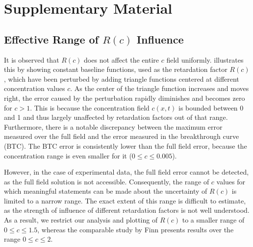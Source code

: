 \appendix
\chapter{Supplementary Material}
\section*{Effective Range of $R(c)$ Influence}
\label{app:supplementary}
It is observed that $R(c)$ does not affect the entire $c$ field uniformly.  illustrates this by showing constant baseline functions, used as the retardation factor $R(c)$, which have been perturbed by adding triangle functions centered at different concentration values $c$. As the center of the triangle function increases and moves right, the error caused by the perturbation rapidly diminishes and becomes zero for $c > 1$. This is because the concentration field $c(x,t)$ is bounded between 0 and 1 and thus largely unaffected by retardation factors out of that range.
Furthermore, there is a notable discrepancy between the maximum error measured over the full field and the error measured in the breakthrough curve (BTC). The BTC error is consistently lower than the full field error, because the concentration range is even smaller for it ($0 \leq c \leq 0.005$).

However, in the case of experimental data, the full field error cannot be detected, as the full field solution is not accessible. Consequently, the range of $c$ values for which meaningful statements can be made about the uncertainty of $R(c)$ is limited to a narrow range. The exact extent of this range is difficult to estimate, as the strength of influence of different retardation factors is not well understood.
As a result, we restrict our analysis and plotting of $R(c)$ to a smaller range of $0 \leq c \leq 1.5$, whereas the comparable study by Finn \cite{finn} presents results over the range $0 \leq c \leq 2$.

